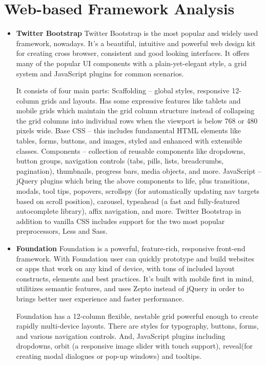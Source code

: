\section{Web-based Framework Analysis}
 \begin{itemize}
	\item \textbf{Twitter Bootstrap}
	\newline
	Twitter Bootstrap is the most popular and widely used framework, nowadays. It's a beautiful, intuitive and powerful web design kit for creating cross browser, consistent and good looking interfaces. It offers many of the popular UI components with a plain-yet-elegant style, a grid system and JavaScript plugins for common scenarios.

	It consists of four main parts:
	Scaffolding – global styles, responsive 12-column grids and layouts. Has some expressive features like tablets and mobile grids which maintain the grid column structure instead of collapsing the grid columns into individual rows when the viewport is below 768 or 480 pixels wide. Base CSS – this includes fundamental HTML elements like tables, forms, buttons, and images, styled and enhanced with extensible classes. Components – collection of reusable components like dropdowns, button groups, navigation controls (tabs, pills, lists, breadcrumbs, pagination), thumbnails, progress bars, media objects, and more. JavaScript – jQuery plugins which bring the above components to life, plus transitions, modals, tool tips, popovers, scrollspy (for automatically updating nav targets based on scroll position), carousel, typeahead (a fast and fully-featured autocomplete library), affix navigation, and more. Twitter Bootstrap in addition to vanilla CSS includes support for the two most popular preprocessors, Less and Sass.
	
	\item \textbf{Foundation}
	\newline
	Foundation is a powerful, feature-rich, responsive front-end framework. With Foundation user can quickly prototype and build websites or apps that work on any kind of device, with tons of included layout constructs, elements and best practices. It's built with mobile first in mind, utilitizes semantic features, and uses Zepto instead of jQuery in order to brings better user experience and faster performance.

	Foundation has a 12-column flexible, nestable grid powerful enough to create rapidly multi-device layouts. There are styles for typography, buttons, forms, and various navigation controls. And, JavaScript plugins including dropdowns, orbit (a responsive image slider with touch support), reveal(for creating modal dialogues or pop-up windows) and tooltips.
	

\end{itemize}
